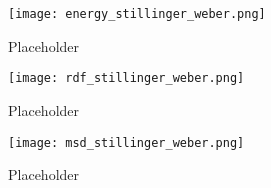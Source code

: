 \begin{figure}[h]
    \centering
    \texttt{[image: energy\_stillinger\_weber.png]}
    \caption{Placeholder}
    \label{fig:msd}
\end{figure}

\begin{figure}[h]
    \centering
    \texttt{[image: rdf\_stillinger\_weber.png]}
    \caption{Placeholder}
    \label{fig:msd}
\end{figure}

\begin{figure}[h]
    \centering
    \texttt{[image: msd\_stillinger\_weber.png]}
    \caption{Placeholder}
    \label{fig:msd}
\end{figure}
